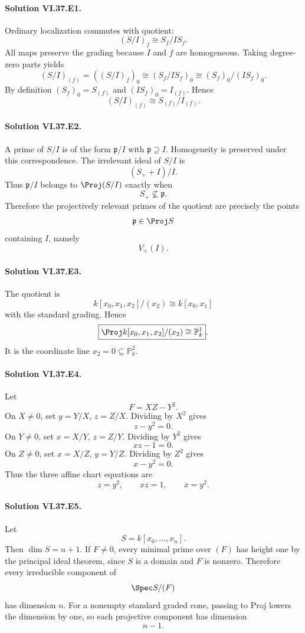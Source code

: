 
\paragraph{Solution VI.37.E1.}
Ordinary localization commutes with quotient:
\[
(S/I)_f\cong S_f/IS_f.
\]
All maps preserve the grading because \(I\) and \(f\) are homogeneous. Taking degree-zero parts yields
\[
(S/I)_{(f)}
=
((S/I)_f)_0
\cong
(S_f/IS_f)_0
\cong
(S_f)_0/(IS_f)_0.
\]
By definition \((S_f)_0=S_{(f)}\) and \((IS_f)_0=I_{(f)}\). Hence
\[
\boxed{(S/I)_{(f)}\cong S_{(f)}/I_{(f)}}.
\]

\paragraph{Solution VI.37.E2.}
A prime of \(S/I\) is of the form \(\mathfrak p/I\) with \(\mathfrak p\supseteq I\). Homogeneity is preserved under this correspondence. The irrelevant ideal of \(S/I\) is
\[
(S_++I)/I.
\]
Thus \(\mathfrak p/I\) belongs to \(\Proj(S/I)\) exactly when
\[
S_+\not\subseteq\mathfrak p.
\]
Therefore the projectively relevant primes of the quotient are precisely the points
\[
\mathfrak p\in\Proj S
\]
containing \(I\), namely
\[
\boxed{V_+(I)}.
\]

\paragraph{Solution VI.37.E3.}
The quotient is
\[
k[x_0,x_1,x_2]/(x_2)\cong k[x_0,x_1]
\]
with the standard grading. Hence
\[
\boxed{\Proj k[x_0,x_1,x_2]/(x_2)\cong\mathbb P^1_k}.
\]
It is the coordinate line \(x_2=0\subseteq\mathbb P^2_k\).

\paragraph{Solution VI.37.E4.}
Let
\[
F=XZ-Y^2.
\]
On \(X\neq0\), set \(y=Y/X\), \(z=Z/X\). Dividing by \(X^2\) gives
\[
z-y^2=0.
\]
On \(Y\neq0\), set \(x=X/Y\), \(z=Z/Y\). Dividing by \(Y^2\) gives
\[
xz-1=0.
\]
On \(Z\neq0\), set \(x=X/Z\), \(y=Y/Z\). Dividing by \(Z^2\) gives
\[
x-y^2=0.
\]
Thus the three affine chart equations are
\[
\boxed{z=y^2,\qquad xz=1,\qquad x=y^2}.
\]

\paragraph{Solution VI.37.E5.}
Let
\[
S=k[x_0,\ldots,x_n].
\]
Then \(\dim S=n+1\). If \(F\neq0\), every minimal prime over \((F)\) has height one by the principal ideal theorem, since \(S\) is a domain and \(F\) is nonzero. Therefore every irreducible component of
\[
\Spec S/(F)
\]
has dimension \(n\). For a nonempty standard graded cone, passing to Proj lowers the dimension by one, so each projective component has dimension
\[
\boxed{n-1}.
\]

